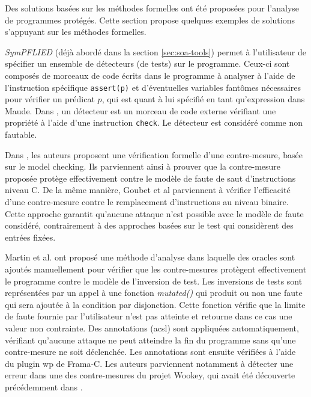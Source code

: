                 Des solutions basées sur les méthodes formelles ont été proposées pour l'analyse de programmes protégés. Cette section propose quelques exemples de solutions s'appuyant sur les méthodes formelles.
                
                \textit{SymPFLIED} \cite{Pattabiraman/DSN08} (déjà abordé dans la section \ref{sec:soa-tools}) permet à l'utilisateur de spécifier un ensemble de détecteurs (de tests) sur le programme. Ceux-ci sont composés de morceaux de code écrits dans le programme à analyser à l'aide de l'instruction spécifique \texttt{assert(p)} et d'éventuelles variables fantômes nécessaires pour vérifier un prédicat $p$, qui est quant à lui spécifié en tant qu'expression dans Maude.
                Dans \cite{Pattabiraman/TC12}, un détecteur est un morceau de code externe vérifiant une propriété à l'aide d'une instruction \texttt{check}. Le détecteur est considéré comme non fautable.
                
                Dans \cite{lalande, heydemann2019formally}, les auteurs proposent une vérification formelle d'une contre-mesure, basée sur le model checking. 
                Ils parviennent ainsi à prouver que la contre-mesure proposée protège effectivement contre le modèle de faute de saut d'instructions niveau C. 
                De la même manière, Goubet et al \cite{Goubet/CARDIS15} parviennent à vérifier l'efficacité d'une contre-mesure contre le remplacement d'instructions au niveau binaire.
                Cette approche garantit qu'aucune attaque n'est possible avec le modèle de faute considéré, contrairement à des approches basées sur le test qui considèrent des entrées fixées.
                
                Martin et al. \cite{martin2022verifying} ont proposé une méthode d'analyse dans laquelle des oracles sont ajoutés manuellement pour vérifier que les contre-mesures protègent effectivement le programme contre le modèle de l'inversion de test. 
                Les inversions de tests sont représentées par un appel à une fonction \textit{mutated()} qui produit ou non une faute qui sera ajoutée à la condition par disjonction. Cette fonction vérifie que la limite de faute fournie par l'utilisateur n'est pas atteinte et retourne dans ce cas une valeur non contrainte.
                Des annotations (\gls{acsl}) sont appliquées automatiquement, vérifiant qu'aucune attaque ne peut atteindre la fin du programme sans qu'une contre-mesure ne soit déclenchée. Les annotations sont ensuite vérifiées à l'aide du plugin \gls{wp} de Frama-C.
                Les auteurs parviennent notamment à détecter une erreur dans une des contre-mesures du projet Wookey, qui avait été découverte précédemment dans \cite{inter_cesti}.
                    

